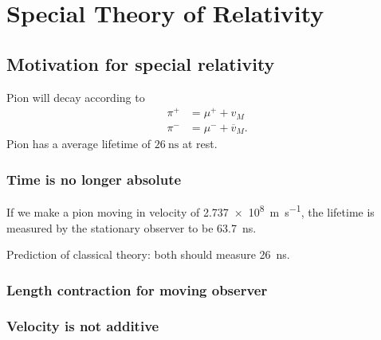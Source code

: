 
\section{Special Theory of Relativity}
\subsection{Motivation for special relativity}

\begin{example}
	
Pion will decay according to \begin{align}
\pi^+ &= \mu^+ + v_M \\
\pi^- &= \mu^- + \overline{v}_M 
.\end{align} 
Pion has a average lifetime of $\SI{26}{\nano\second}$ at rest. 
\end{example}

\subsubsection{Time is no longer absolute}

If we make a pion moving in velocity of \SI{2.737e8}{\meter\per\second}, the lifetime is measured by the stationary observer to be \SI{63.7}{\nano\second}. 

Prediction of classical theory: both should measure \SI{26}{\nano\second}.

\subsubsection{Length contraction for moving observer}



\subsubsection{Velocity is not additive}





